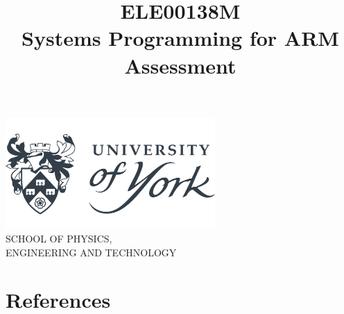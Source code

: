 \documentclass[12pt,a4paper]{article}
\title{ELE00138M\\Systems Programming for ARM Assessment}
\begin{document}
\begin{center}
	
	\includegraphics[width=0.6\textwidth]{uni_logo.png}\\
	\large
	SCHOOL OF PHYSICS,\\ENGINEERING AND TECHNOLOGY
	
	\vspace{6cm}
	
	\let\newpage\relax
	\maketitle
	
	\vspace{1cm}
	
	\pagebreak
\end{center}
\justifying

\pagebreak

{
	\renewcommand{\baselinestretch}{0.75}\normalsize
	\tableofcontents
}

\pagebreak











\section{References}
\printbibliography[heading=none]
\end{document}
